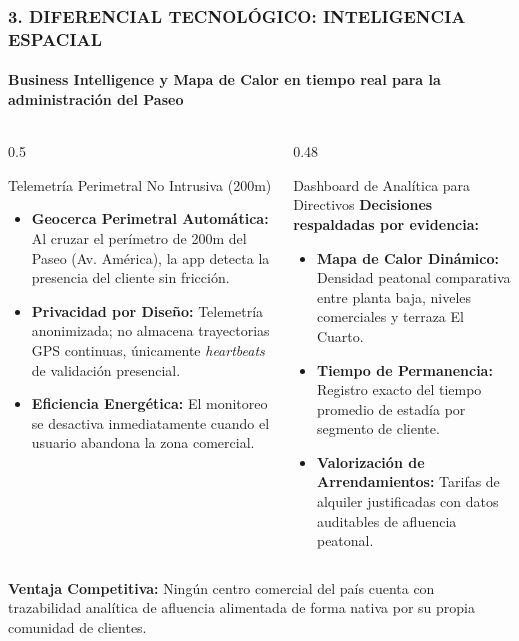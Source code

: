 \documentclass[aspectratio=169, 10pt]{beamer}
\begin{document}
\begin{frame}
  \frametitle{3. DIFERENCIAL TECNOLÓGICO: INTELIGENCIA ESPACIAL}
  \framesubtitle{Business Intelligence y Mapa de Calor en tiempo real para la administración del Paseo}

  \begin{columns}[T]
    \begin{column}{0.5\textwidth}
      \begin{block}{Telemetría Perimetral No Intrusiva (200m)}
        \footnotesize
        \begin{itemize}\setlength\itemsep{0.3em}
          \item \textbf{Geocerca Perimetral Automática:} Al cruzar el perímetro de 200m del Paseo (Av. América), la app detecta la presencia del cliente sin fricción.
          \item \textbf{Privacidad por Diseño:} Telemetría anonimizada; no almacena trayectorias GPS continuas, únicamente \textit{heartbeats} de validación presencial.
          \item \textbf{Eficiencia Energética:} El monitoreo se desactiva inmediatamente cuando el usuario abandona la zona comercial.
        \end{itemize}
      \end{block}
    \end{column}

    \begin{column}{0.48\textwidth}
      \begin{exampleblock}{Dashboard de Analítica para Directivos}
        \footnotesize
        \textbf{Decisiones respaldadas por evidencia:}
        \begin{itemize}\setlength\itemsep{0.3em}
          \item \textbf{Mapa de Calor Dinámico:} Densidad peatonal comparativa entre planta baja, niveles comerciales y terraza El Cuarto.
          \item \textbf{Tiempo de Permanencia:} Registro exacto del tiempo promedio de estadía por segmento de cliente.
          \item \textbf{Valorización de Arrendamientos:} Tarifas de alquiler justificadas con datos auditables de afluencia peatonal.
        \end{itemize}
      \end{exampleblock}
    \end{column}
  \end{columns}

  \vskip 0.25cm
  \begin{center}
    \footnotesize \color{AranjuezOrange} \textbf{Ventaja Competitiva:} Ningún centro comercial del país cuenta con trazabilidad analítica de afluencia alimentada de forma nativa por su propia comunidad de clientes.
  \end{center}
\end{frame}
\end{document}
